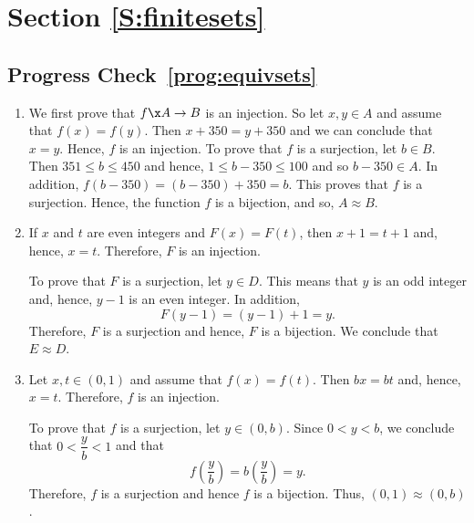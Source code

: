 \section*{Section \ref{S:finitesets}}

\subsection*{Progress Check~\ref{prog:equivsets}}
\begin{enumerate}

\item We first prove that $f\x A \to B$ is an injection.  So let $x, y \in A$ and assume that $f(x) = f(y)$.  Then $x + 350 = y + 350$ and we can conclude that $x = y$.  Hence, $f$ is an injection.  To prove that $f$ is a surjection, let $b \in B$.  Then $351 \leq b \leq 450$ and hence, $1 \leq b - 350 \leq 100$ and so $b - 350 \in A$.  In addition, $f(b - 350) = (b - 350) + 350 = b$.  This proves that $f$ is a surjection.  Hence, the function $f$ is a bijection, and so, $A \approx B$.

\item If $x$ and $t$ are even integers and $F ( x ) = F ( t )$, then 
$x + 1 = t + 1$ and, hence, $x = t$.  Therefore, $F$ is an injection.

To prove that $F$ is a surjection, let $y \in D$.  This means that $y$ is an odd integer and, hence, $y - 1$ is an even integer.  In addition,
\[
F ( y - 1 ) = ( y - 1 ) + 1 = y.
\]
Therefore, $F$ is a surjection and hence, $F$ is a bijection.  We conclude that $E \approx D$.

\item Let $x, t \in ( 0, 1 )$ and assume that $f ( x ) = f ( t )$.  Then 
$bx = bt$ and, hence, $x = t$.  Therefore, $f$ is an injection.

To prove that $f$ is a surjection, let $y \in ( 0, b )$.  Since $0 < y < b$, we conclude that $0 < \dfrac{y}{b} < 1$ and that
\[
f \!\left( \dfrac{y}{b} \right) = b \!\left( \dfrac{y}{b} \right) = y.
\]
Therefore, $f$ is a surjection and hence $f$ is a bijection.  Thus, 
$( 0, 1 ) \approx ( 0, b )$.
\end{enumerate}

\hbreak





\endinput

